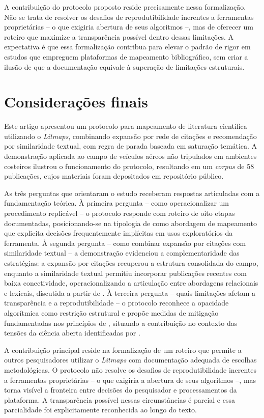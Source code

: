 \documentclass[portuguese]{textolivre}
\begin{document}
	A contribuição do protocolo proposto reside precisamente nessa formalização. Não se trata de resolver os desafios de reprodutibilidade inerentes a ferramentas proprietárias – o que exigiria abertura de seus algoritmos –, mas de oferecer um roteiro que maximize a transparência possível dentro dessas limitações. A expectativa é que essa formalização contribua para elevar o padrão de rigor em estudos que empreguem plataformas de mapeamento bibliográfico, sem criar a ilusão de que a documentação equivale à superação de limitações estruturais.

\section{Considerações finais}\label{sec-codigos}
Este artigo apresentou um protocolo para mapeamento de literatura científica utilizando o \textit{Litmaps}, combinando expansão por rede de citações e recomendação por similaridade textual, com regra de parada baseada em saturação temática. A demonstração aplicada ao campo de veículos aéreos não tripulados em ambientes costeiros ilustrou o funcionamento do protocolo, resultando em um \textit{corpus} de 58 publicações, cujos materiais foram depositados em repositório público.

	As três perguntas que orientaram o estudo receberam respostas articuladas com a fundamentação teórica. À primeira pergunta – como operacionalizar um procedimento replicável – o protocolo responde com roteiro de oito etapas documentadas, posicionando-se na tipologia de \textcite{Grant2009} como abordagem de mapeamento que explicita decisões frequentemente implícitas em usos exploratórios da ferramenta. À segunda pergunta – como combinar expansão por citações com similaridade textual – a demonstração evidenciou a complementaridade das estratégias: a expansão por citações recuperou a estrutura consolidada do campo, enquanto a similaridade textual permitiu incorporar publicações recentes com baixa conectividade, operacionalizando a articulação entre abordagens relacionais e lexicais, discutida a partir de \textcite{Zupic2015}. À terceira pergunta – quais limitações afetam a transparência e a reprodutibilidade – o protocolo reconhece a opacidade algorítmica como restrição estrutural e propõe medidas de mitigação fundamentadas nos princípios de \textcite{Munafo2017}, situando a contribuição no contexto das tensões da ciência aberta identificadas por \textcite{Quintanilha2019}.
    
	A contribuição principal reside na formalização de um roteiro que permite a outros pesquisadores utilizar o \textit{Litmaps} com documentação adequada de escolhas metodológicas. O protocolo não resolve os desafios de reprodutibilidade inerentes a ferramentas proprietárias – o que exigiria a abertura de seus algoritmos –, mas torna visível a fronteira entre decisões do pesquisador e processamentos da plataforma. A transparência possível nessas circunstâncias é parcial e essa parcialidade foi explicitamente reconhecida ao longo do texto.
    
\end{document}
